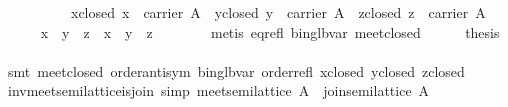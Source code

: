 \begin{isabellebody}
%
\isadelimproof
\ \ %
\endisadelimproof
%
\isatagproof
{}\isamarkupfalse%
\ {}\isanewline
\ \ \ \ \isamarkupfalse%
\ x{}closed{}\ {}x\ {}\ carrier\ A{}\ \ y{}closed{}\ {}y\ {}\ carrier\ A{}\ \ z{}closed{}\ {}z\ {}\ carrier\ A{}\isanewline
\ \ \ \ \isamarkupfalse%
\ {}{}x\ {}\ y{}\ {}\ z\ {}\ x\ {}\ {}y\ {}\ z{}{}\isanewline
\ \ \ \ \ \ \isamarkupfalse%
\ {}metis\ eq{}refl\ bin{}glb{}var\ meet{}closed{}\isanewline
\ \ \ \ \isamarkupfalse%
\ {}thesis\isanewline
\ \ \ \ \ \ \isamarkupfalse%
\ {}smt\ meet{}closed\ order{}antisym\ bin{}glb{}var\ order{}refl\ x{}closed\ y{}closed\ z{}closed{}\isanewline
\ \ \isamarkupfalse%
%
\endisatagproof
{\isafoldproof}%
%
\isadelimproof
\isanewline
%
\endisadelimproof
\isanewline
{}\isamarkupfalse%
\isanewline
\isanewline
{}\isamarkupfalse%
\ inv{}meet{}semilattice{}is{}join\ {}simp{}{}\ {}meet{}semilattice\ {}A{}{}\ {}\ join{}semilattice\ A{}\isanewline

\end{isabellebody}
